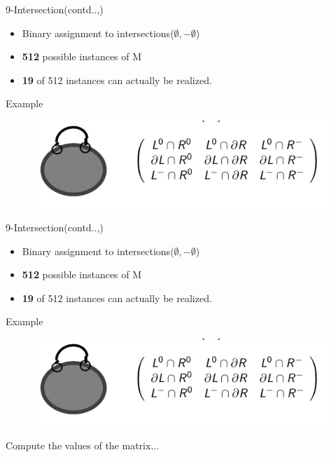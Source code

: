 \begin{frame}{9-Intersection(contd..,)}
	\begin{block}{}
	\begin{itemize}
	\item Binary assignment to intersections($\emptyset,  -\emptyset$)
	\item \textbf{512} possible instances of M
	\item \textbf{19} of 512 instances can actually be realized.
	\end{itemize}
\end{block}		
\begin{block}{Example}
\begin{figure}[l]
\includegraphics[width = \textwidth]{images/9examplemat.png}
\end{figure} 
\end{block}
\end{frame}

\begin{frame}{9-Intersection(contd..,)}
	\begin{block}{}
	\begin{itemize}
	\item Binary assignment to intersections($\emptyset,  -\emptyset$)
	\item \textbf{512} possible instances of M
	\item \textbf{19} of 512 instances can actually be realized.
	\end{itemize}
\end{block}		
\begin{block}{Example}
\begin{figure}[l]
\includegraphics[width = \textwidth]{images/9examplemat.png}
\end{figure} 
Compute the values of the matrix...
\end{block}
\end{frame}



